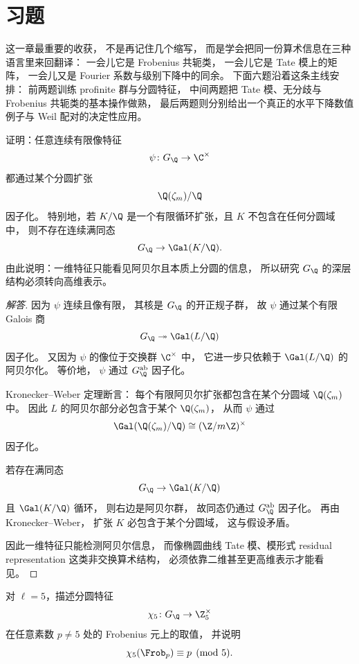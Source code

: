 \section{习题}
\label{sec:ch09-exercises}

\providecommand{\Zl}{\mathbb{Z}_\ell}
\providecommand{\Ql}{\mathbb{Q}_\ell}
\providecommand{\rhobar}{\bar{\rho}}

这一章最重要的收获，
不是再记住几个缩写，
而是学会把同一份算术信息在三种语言里来回翻译：
一会儿它是 Frobenius 共轭类，
一会儿它是 Tate 模上的矩阵，
一会儿又是 Fourier 系数与级别下降中的同余。
下面六题沿着这条主线安排：
前两题训练 profinite 群与分圆特征，
中间两题把 Tate 模、无分歧与 Frobenius 共轭类的基本操作做熟，
最后两题则分别给出一个真正的水平下降数值例子与 Weil 配对的决定性应用。



\begin{exercise}
证明：任意连续有限像特征
\[
  \psi\colon G_\Q\to \C^\times
\]
都通过某个分圆扩张
\[
  \Q(\zeta_m)/\Q
\]
因子化。
特别地，若 $K/\Q$ 是一个有限循环扩张，且 $K$ 不包含在任何分圆域中，
则不存在连续满同态
\[
  G_\Q\to \Gal(K/\Q).
\]
由此说明：一维特征只能看见阿贝尔且本质上分圆的信息，
所以研究 $G_\Q$ 的深层结构必须转向高维表示。
\end{exercise}

\begin{proof}[解答]
因为 $\psi$ 连续且像有限，
其核是 $G_\Q$ 的开正规子群，
故 $\psi$ 通过某个有限 Galois 商
\[
  G_\Q\twoheadrightarrow \Gal(L/\Q)
\]
因子化。
又因为 $\psi$ 的像位于交换群 $\C^\times$ 中，
它进一步只依赖于 $\Gal(L/\Q)$ 的阿贝尔化。
等价地，
$\psi$ 通过 $G_\Q^{\mathrm{ab}}$ 因子化。

Kronecker--Weber 定理断言：
每个有限阿贝尔扩张都包含在某个分圆域 $\Q(\zeta_m)$ 中。
因此 $L$ 的阿贝尔部分必包含于某个 $\Q(\zeta_m)$，
从而 $\psi$ 通过
\[
  \Gal(\Q(\zeta_m)/\Q)
  \cong
  (\Z/m\Z)^\times
\]
因子化。

若存在满同态
\[
  G_\Q\to \Gal(K/\Q)
\]
且 $\Gal(K/\Q)$ 循环，
则右边是阿贝尔群，
故同态仍通过 $G_\Q^{\mathrm{ab}}$ 因子化。
再由 Kronecker--Weber，
扩张 $K$ 必包含于某个分圆域，
这与假设矛盾。

因此一维特征只能检测阿贝尔信息，
而像椭圆曲线 Tate 模、模形式 residual representation 这类非交换算术结构，
必须依靠二维甚至更高维表示才能看见。
\end{proof}

\begin{exercise}
对 $\ell=5$，描述分圆特征
\[
  \chi_5\colon G_\Q\to \Z_5^\times
\]
在任意素数 $p\neq 5$ 处的 Frobenius 元上的取值，
并说明
\[
  \chi_5(\Frob_p)\equiv p\pmod 5.
\]
\end{exercise}

